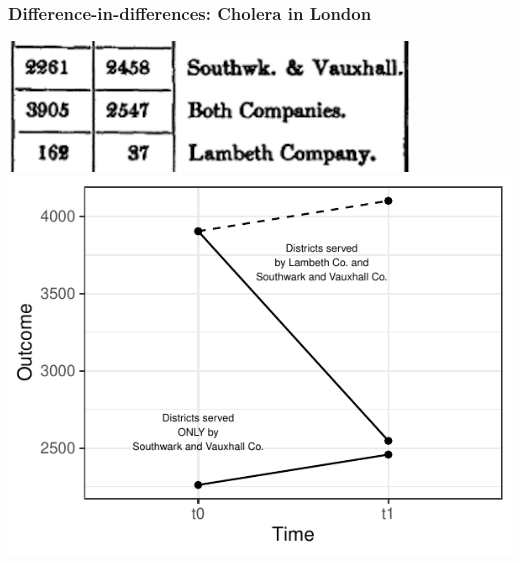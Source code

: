 \documentclass[aspectratio=43]{beamer}
\begin{document}
\begin{frame}
\frametitle{Difference-in-differences: Cholera in London}
\centering

\begin{minipage}{0.49\textwidth}\centering
\includegraphics[width = 0.8\textwidth]{../img/snow_table12_zoom}\\\vspace{25pt}
\includegraphics[width = \textwidth]{../img/did_snow}
\end{minipage}\hfill
\begin{minipage}{0.49\textwidth}\centering

\end{minipage}
\end{frame}
\end{document}
